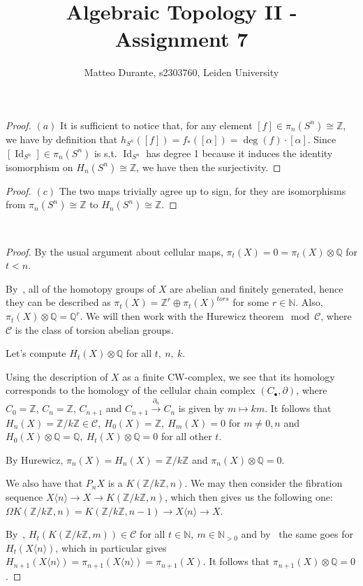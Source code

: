 \documentclass{article}
\newcommand{\numberset}{\mathbb}
\newcommand{\N}{\numberset{N}}
\newcommand{\Z}{\numberset{Z}}
\newcommand{\Q}{\numberset{Q}}
\newcommand{\exercise}[1]{\noindent {\bf Exercise #1}}
\DeclareMathOperator{\Id}{Id}
\begin{document}
\title{Algebraic Topology II - Assignment 7}

\author{Matteo Durante, s2303760, Leiden University}

\maketitle

\exercise{2}

\begin{proof}
    $(a)$ It is sufficient to notice that, for any element
    $[f]\in\pi_n(S^n)\cong\Z$, we have by definition that
    $h_{S^n}([f])=f_*([\alpha])=\deg(f)\cdot [\alpha]$. Since
    $[\Id_{S^n}]\in\pi_n(S^n)$ is s.t. $\Id_{S^n}$ has degree 1 because it
    induces the identity isomorphism on $H_n(S^n)\cong\Z$, we have then the
    surjectivity.
\end{proof}

\begin{proof}
    $(c)$ The two maps trivially agree up to sign, for they are isomorphisms
    from $\pi_n(S^n)\cong\Z$ to $H_n(S^n)\cong\Z$.
\end{proof}


~\\
\exercise{3}

\begin{proof}    
    By the usual argument about cellular maps, $\pi_t(X)=0=\pi_t(X)\otimes\Q$
    for $t<n$.
    
    By~\cite[thm. 12.1]{HM19}, all of the homotopy groups of $X$ are abelian and
    finitely generated, hence they can be described as
    $\pi_t(X)=\Z^r\oplus\pi_t(X)^{tors}$ for some $r\in\N$. Also,
    $\pi_t(X)\otimes\Q=\Q^r$. We will then work with the Hurewicz
    theorem$\mod\mathcal{C}$, where $\mathcal{C}$ is the class of torsion
    abelian groups.
    
    Let's compute $H_t(X)\otimes\Q$ for all $t,\ n,\ k$.

    Using the description of $X$ as a finite CW-complex, we see that its
    homology corresponds to the homology of the cellular chain complex
    $(C_\bullet,\partial)$, where $C_0=\Z$, $C_n=\Z$, $C_{n+1}$ and
    $C_{n+1}\xrightarrow{\partial_n}C_n$ is given by $m\mapsto km$. It follows
    that $H_n(X)=\Z/k\Z\in\mathcal{C},\ H_0(X)=\Z,\ H_m(X)=0$ for $m\neq 0,n$
    and $H_0(X)\otimes\Q=\Q,\ H_t(X)\otimes\Q=0$ for all other $t$.

    By Hurewicz, $\pi_n(X)=H_n(X)=\Z/k\Z$ and $\pi_n(X)\otimes\Q=0$.

    We also have that $P_nX$ is a $K(\Z/k\Z,n)$. We may then consider the
    fibration sequence $X\langle n\rangle\rightarrow X\rightarrow K(\Z/k\Z,n)$,
    which then gives us the following one: $\Omega
    K(\Z/k\Z,n)=K(\Z/k\Z,n-1)\rightarrow X\langle n\rangle\rightarrow X$.

    By~\cite[lemma 13.16]{HM19}, $H_t(K(\Z/k\Z,m))\in\mathcal{C}$ for all
    $t\in\N,\ m\in\N_{>0}$ and by~\cite[lemma 13.15]{HM19} the same goes for
    $H_t(X\langle n\rangle)$, which in particular gives
    $H_{n+1}(X\langle n\rangle)=\pi_{n+1}(X\langle n\rangle)=\pi_{n+1}(X)$. It
    follows that $\pi_{n+1}(X)\otimes\Q=0$.
\end{proof}

\printbibliography
\end{document}
